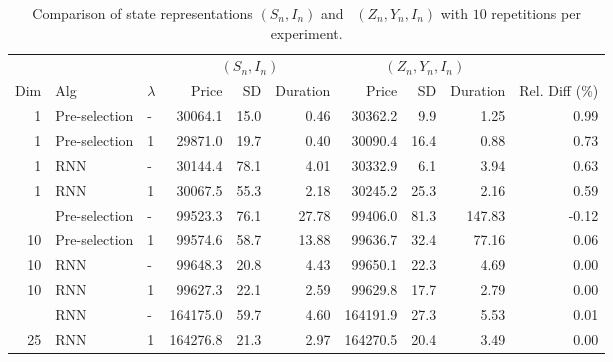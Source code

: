 \begin{table}

\caption{\label{tab:state_representation}Comparison of state representations $(S_n,I_n)$ and \ $(Z_n,Y_n,I_n)$ with $10$ repetitions per experiment.}
\footnotesize
\setlength{\tabcolsep}{4pt}
\centering
\begin{tabular}[t]{rllrrrrrrr}
\toprule
\multicolumn{3}{c}{ } & \multicolumn{3}{c}{$(S_n,I_n)$} & \multicolumn{3}{c}{$(Z_n,Y_n,I_n)$} & \multicolumn{1}{c}{ } \\
\cmidrule(l{3pt}r{3pt}){4-6} \cmidrule(l{3pt}r{3pt}){7-9}
Dim & Alg & $\lambda$ & Price & SD & Duration & Price & SD & Duration & Rel. Diff (\%)\\
\midrule
1 & Pre-selection & - & 30064.1 & 15.0 & 0.46 & 30362.2 & 9.9 & 1.25 & 0.99\\
1 & Pre-selection & 1 & 29871.0 & 19.7 & 0.40 & 30090.4 & 16.4 & 0.88 & 0.73\\
1 & RNN & - & 30144.4 & 78.1 & 4.01 & 30332.9 & 6.1 & 3.94 & 0.63\\
1 & RNN & 1 & 30067.5 & 55.3 & 2.18 & 30245.2 & 25.3 & 2.16 & 0.59\\
\addlinespace
10 & Pre-selection & - & 99523.3 & 76.1 & 27.78 & 99406.0 & 81.3 & 147.83 & -0.12\\
10 & Pre-selection & 1 & 99574.6 & 58.7 & 13.88 & 99636.7 & 32.4 & 77.16 & 0.06\\
10 & RNN & - & 99648.3 & 20.8 & 4.43 & 99650.1 & 22.3 & 4.69 & 0.00\\
10 & RNN & 1 & 99627.3 & 22.1 & 2.59 & 99629.8 & 17.7 & 2.79 & 0.00\\
\addlinespace
25 & RNN & - & 164175.0 & 59.7 & 4.60 & 164191.9 & 27.3 & 5.53 & 0.01\\
25 & RNN & 1 & 164276.8 & 21.3 & 2.97 & 164270.5 & 20.4 & 3.49 & 0.00\\
\bottomrule
\end{tabular}
\end{table}
